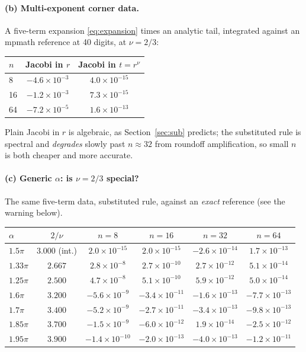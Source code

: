 \documentclass[11pt]{article}
\theoremstyle{remark}
\begin{document}
\paragraph{(b) Multi-exponent corner data.} A five-term expansion
\eqref{eq:expansion} times an analytic tail, integrated against an mpmath
reference at 40 digits, at $\nu=2/3$:
\medskip

\begin{center}
\begin{tabular}{lcc}
\toprule
$n$ & Jacobi in $r$ & Jacobi in $t=r^{\nu}$ \\
\midrule
8  & $-4.6\times10^{-3}$ & $4.0\times10^{-15}$\\
16 & $-1.2\times10^{-3}$ & $7.3\times10^{-15}$\\
64 & $-7.2\times10^{-5}$ & $1.6\times10^{-13}$\\
\bottomrule
\end{tabular}
\end{center}
\medskip

\noindent
Plain Jacobi in $r$ is algebraic, as Section~\ref{sec:sub} predicts; the
substituted rule is spectral and \emph{degrades} slowly past $n\approx32$ from
roundoff amplification, so small $n$ is both cheaper and more accurate.

\paragraph{(c) Generic $\alpha$: is $\nu=2/3$ special?} The same five-term data,
substituted rule, against an \emph{exact} reference (see the warning below).
\medskip

\begin{center}
\begin{tabular}{lccccc}
\toprule
$\alpha$ & $2/\nu$ & $n=8$ & $n=16$ & $n=32$ & $n=64$\\
\midrule
$1.5\pi$   & $3.000$ (int.) & $2.0\times10^{-15}$ & $2.0\times10^{-15}$ & $-2.6\times10^{-14}$ & $1.7\times10^{-13}$\\
$1.33\pi$  & $2.667$ & $2.8\times10^{-8}$ & $2.7\times10^{-10}$ & $2.7\times10^{-12}$ & $5.1\times10^{-14}$\\
$1.25\pi$  & $2.500$ & $4.7\times10^{-8}$ & $5.1\times10^{-10}$ & $5.9\times10^{-12}$ & $5.0\times10^{-14}$\\
$1.6\pi$   & $3.200$ & $-5.6\times10^{-9}$ & $-3.4\times10^{-11}$ & $-1.6\times10^{-13}$ & $-7.7\times10^{-13}$\\
$1.7\pi$   & $3.400$ & $-5.2\times10^{-9}$ & $-2.7\times10^{-11}$ & $-3.4\times10^{-13}$ & $-9.8\times10^{-13}$\\
$1.85\pi$  & $3.700$ & $-1.5\times10^{-9}$ & $-6.0\times10^{-12}$ & $1.9\times10^{-14}$ & $-2.5\times10^{-12}$\\
$1.95\pi$  & $3.900$ & $-1.4\times10^{-10}$ & $-2.0\times10^{-13}$ & $-4.0\times10^{-13}$ & $-1.2\times10^{-11}$\\
\bottomrule
\end{tabular}
\end{center}
\medskip
\end{document}
